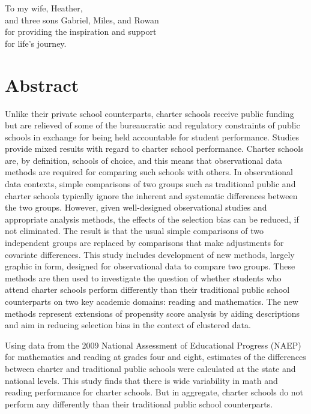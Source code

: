 \documentclass[letterpaper,12pt]{article} %
\begin{document}

\setcounter{page}{3}

{}
\vspace*{2.5 in}
\begin{center}
\noindent To my wife, Heather,\\and three sons Gabriel, Miles, and Rowan\\for providing the inspiration and support\\for life's journey.
\end{center}
\vspace*{\fill}


\cleardoublepage
\section{Abstract}

Unlike their private school counterparts, charter schools receive public funding but are relieved of some of the bureaucratic and regulatory constraints of public schools in exchange for being held accountable for student performance. Studies provide mixed results with regard to charter school performance. Charter schools are, by definition, schools of choice, and this means that observational data methods are required for comparing such schools with others. In observational data contexts, simple comparisons of two groups such as traditional public and charter schools typically ignore the inherent and systematic differences between the two groups. %
However, given well-designed observational studies and appropriate analysis methods, the effects of the selection bias can be reduced, if not eliminated. The result is that the usual simple comparisons of two independent groups are replaced by comparisons that make adjustments for covariate differences. This study includes development of new methods, largely graphic in form, designed for observational data to compare two groups. These methods are then used to investigate the question of whether students who attend charter schools perform differently than their traditional public school counterparts on two key academic domains: reading and mathematics. The new methods represent extensions of propensity score analysis \cite{RosenbaumRubin1983} by aiding descriptions and aim in reducing selection bias in the context of clustered data.

Using data from the 2009 National Assessment of Educational Progress (NAEP) for mathematics and reading at grades four and eight, estimates of the differences between charter and traditional public schools were calculated at the state and national levels. This study finds that there is wide variability in math and reading performance for charter schools. But in aggregate, charter schools do not perform any differently than their traditional public school counterparts. 
\end{document}
